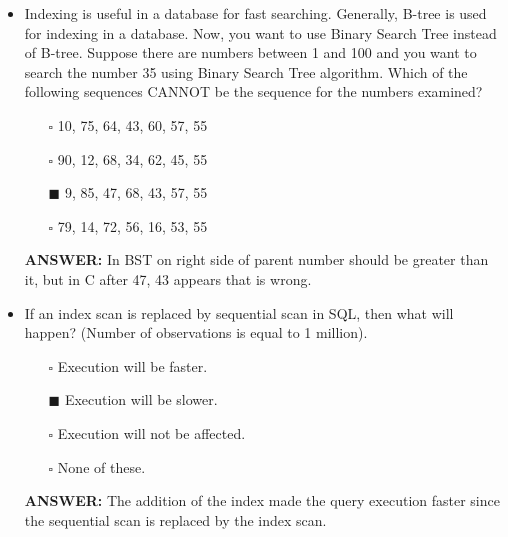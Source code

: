 \documentclass[10pt]{article}
\begin{document}
\begin{itemize}
		\item Indexing is useful in a database for fast searching. Generally, B-tree is used for indexing in a database. Now, you want to use Binary Search Tree instead of B-tree. Suppose there are numbers between 1 and 100 and you want to search the number 35 using Binary Search Tree algorithm. Which of the following sequences CANNOT be the sequence for the numbers examined?
			\begin{enumerate}
				\item[$\square$] 10, 75, 64, 43, 60, 57, 55
				\item[$\square$] 90, 12, 68, 34, 62, 45, 55
				\item[$\blacksquare$] 9, 85, 47, 68, 43, 57, 55
				\item[$\square$] 79, 14, 72, 56, 16, 53, 55
			\end{enumerate}
			\color{red} \textbf{ANSWER:} \color{black} In BST on right side of parent number should be greater than it, but in C after 47, 43 appears that is wrong.
		
		\item If an index scan is replaced by sequential scan in SQL, then what will happen? (Number of observations is equal to 1 million).
			\begin{enumerate}
				\item[$\square$] Execution will be faster.
				\item[$\blacksquare$] Execution will be slower.
				\item[$\square$] Execution will not be affected.
				\item[$\square$] None of these.
			\end{enumerate}
			\color{red} \textbf{ANSWER:} \color{black} The addition of the index made the query execution faster since the sequential scan is replaced by the index scan.


\end{itemize}
\end{document}

